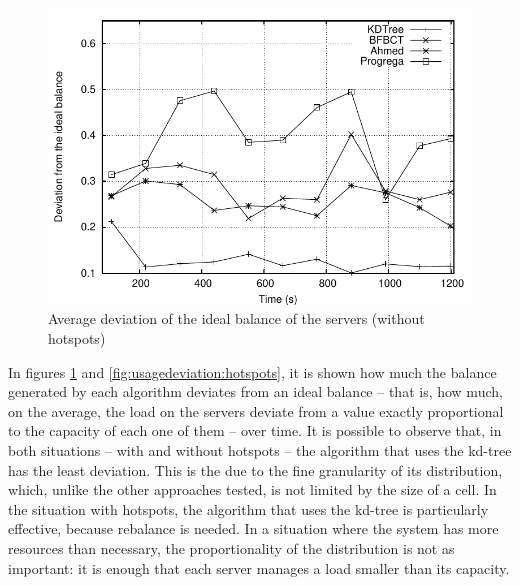 \documentclass[acmjacm]{acmtrans2m}
\begin{document}
\begin{figure}[!t]
	\includegraphics[width=0.49\linewidth]{images/usagedeviation_hotspots}



	\caption{Average deviation of the ideal balance of the servers (without hotspots)}
	\label{fig:usagedeviation:uniform}
\end{figure}



In figures \ref{fig:usagedeviation:uniform} and \ref{fig:usagedeviation:hotspots}, it is shown how much the balance generated by each algorithm deviates from an ideal balance -- that is, how much, on the average, the load on the servers deviate from a value exactly proportional to the capacity of each one of them -- over time. It is possible to observe that, in both situations -- with and without hotspots -- the algorithm that uses the kd-tree has the least deviation. This is the due to the fine granularity of its distribution, which, unlike the other approaches tested, is not limited by the size of a cell. In the situation with hotspots, the algorithm that uses the kd-tree is particularly effective, because rebalance is needed. In a situation where the system has more resources than necessary, the proportionality of the distribution is not as important: it is enough that each server manages a load smaller than its capacity.
\end{document}
